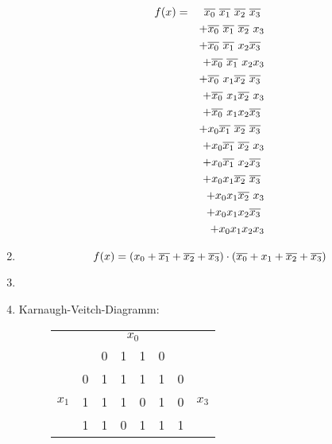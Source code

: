 \documentclass[DIN, pagenumber=false, fontsize=11pt, parskip=half]{scrartcl}
\newcommand{\minTerm}[4]{
    \IfEqCase{#1}{
        {0}{\overline{x_0}\ }
        {1}{x_0}
    }
    \IfEqCase{#2}{
        {0}{\overline{x_1}\ }
        {1}{x_1}
    }
    \IfEqCase{#3}{
        {0}{\overline{x_2}\ }
        {1}{x_2}
    }
    \IfEqCase{#4}{
        {0}{\overline{x_3}\ }
        {1}{x_3}
    }[\PackageError{minTerm}{Values must either be 0 or 1}]
}
\newcommand{\maxTerm}[4]{
    (
    \IfEqCase{#1}{
        {0}{\overline{x_0} + }
        {1}{x_0 + }
    }
    \IfEqCase{#2}{
        {0}{\overline{x_1} + }
        {1}{x_1 + }
    }
    \IfEqCase{#3}{
        {0}{\overline{x_2} + }
        {1}{x_2 + }
    }
    \IfEqCase{#4}{
        {0}{\overline{x_3}}
        {1}{x_3}
    }[\PackageError{minTerm}{Values must either be 0 or 1}]
    )
}
\begin{document}
\begin{enumerate}[label = (\alph*)]
            \begin{eqnarray*}
                f(x) &=& \minTerm{0}{0}{0}{0}\\
                    && + \minTerm{0}{0}{0}{1}\\ 
                    && + \minTerm{0}{0}{1}{0}\\ 
                    && + \minTerm{0}{0}{1}{1}\\ 
                    && + \minTerm{0}{1}{0}{0}\\ 
                    && + \minTerm{0}{1}{0}{1}\\ 
                    && + \minTerm{0}{1}{1}{0}\\ 
                    && + \minTerm{1}{0}{0}{0}\\ 
                    && + \minTerm{1}{0}{0}{1}\\ 
                    && + \minTerm{1}{0}{1}{0}\\ 
                    && + \minTerm{1}{1}{0}{0}\\ 
                    && + \minTerm{1}{1}{0}{1}\\ 
                    && + \minTerm{1}{1}{1}{0}\\ 
                    && + \minTerm{1}{1}{1}{1}\\ 
            \end{eqnarray*}
        \item
            \begin{equation*}
                f(x) = \maxTerm{1}{0}{0}{0} \cdot \maxTerm{0}{1}{0}{0}
            \end{equation*}
        \item %
        \item
            Karnaugh-Veitch-Diagramm:
            \begin{figure}[H]
                \centering
                \begin{tabular}{cc|cccc|cc}
                    & &  & \multicolumn{2}{c}{$x_0$} & & \\
                    & & 0 & 1 & 1 & 0\\
                    \midrule
                    \multirow{4}{*}{$x_1$} & 0 & \cellcolor{purple!50}1 & \cellcolor{purple!50}1 & \cellcolor{blue!50}1 & \cellcolor{purple!50}1 & 0 &\multirow{4}{*}{$x_3$}\\
                     & 1 & \cellcolor{purple!50}1 & \cellcolor{purple!50}1 & 0 & \cellcolor{red!50}1 & 0\\
                     & 1 & \cellcolor{green!50}1 & 0 & \cellcolor{orange!50}1 & \cellcolor{orange!50}1 & 1\\

\end{tabular}
\end{figure}
\end{enumerate}
\end{document}
